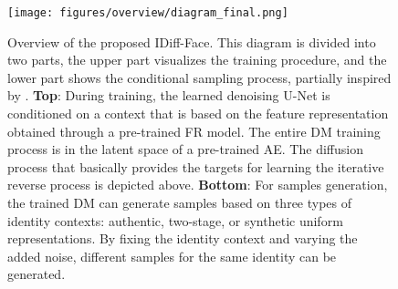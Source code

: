 \documentclass[10pt,twocolumn,letterpaper]{article}
\newcommand{\approachnamewithoutspace}{IDiff-Face}
\begin{document}
\begin{figure}[t!]
    \begin{center}
        \texttt{[image: figures/overview/diagram\_final.png]}
    \end{center}
    \vspace{-6mm}
    \caption{Overview of the proposed \approachnamewithoutspace. This diagram is divided into two parts, the upper part  visualizes the training procedure, and the lower part  shows the conditional sampling process, partially inspired by \cite{Rombach2021}. \textbf{Top}: During training, the learned denoising U-Net is conditioned on a context that is based on the feature representation obtained through a pre-trained FR model. The entire DM training process is in the latent space of a pre-trained AE.
    The diffusion process that basically provides the targets for learning the iterative reverse process is depicted above. \textbf{Bottom}: For samples generation, the trained DM can generate samples based on three types of identity contexts:  authentic, two-stage, or synthetic uniform representations. By fixing the identity context and varying the added noise, different samples for the same identity can be generated. 
}
    \label{fig:approach_overview}
    \vspace{-5mm}
\end{figure}
\end{document}
